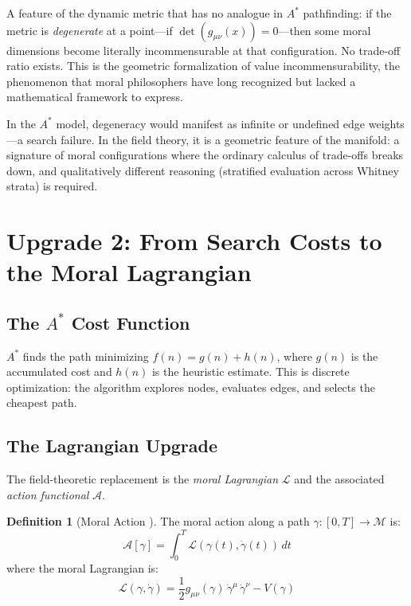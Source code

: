 \documentclass[12pt,letterpaper]{article}
\theoremstyle{definition}
\newtheorem{definition}[theorem]{Definition}
\newcommand{\calM}{\mathcal{M}}
\newcommand{\calA}{\mathcal{A}}
\newcommand{\calL}{\mathcal{L}}
\begin{document}
A feature of the dynamic metric that has no analogue in $A^*$ pathfinding: if the metric is \emph{degenerate} at a point---if $\det(g_{\mu\nu}(x)) = 0$---then some moral dimensions become literally incommensurable at that configuration. No trade-off ratio exists. This is the geometric formalization of value incommensurability, the phenomenon that moral philosophers have long recognized but lacked a mathematical framework to express.

In the $A^*$ model, degeneracy would manifest as infinite or undefined edge weights---a search failure. In the field theory, it is a geometric feature of the manifold: a signature of moral configurations where the ordinary calculus of trade-offs breaks down, and qualitatively different reasoning (stratified evaluation across Whitney strata) is required.


\section{Upgrade 2: From Search Costs to the Moral Lagrangian}
\label{sec:lagrangian}

\subsection{The $A^*$ Cost Function}

$A^*$ finds the path minimizing $f(n) = g(n) + h(n)$, where $g(n)$ is the accumulated cost and $h(n)$ is the heuristic estimate. This is discrete optimization: the algorithm explores nodes, evaluates edges, and selects the cheapest path.

\subsection{The Lagrangian Upgrade}

The field-theoretic replacement is the \emph{moral Lagrangian} $\calL$ and the associated \emph{action functional} $\calA$.

\begin{definition}[Moral Action {\cite[\S11.4]{bond2026ge}}]
The moral action along a path $\gamma: [0,T] \to \calM$ is:
\begin{equation}
\calA[\gamma] = \int_0^T \calL(\gamma(t), \dot{\gamma}(t))\, dt
\end{equation}
where the moral Lagrangian is:
\begin{equation}\label{eq:lagrangian}
\calL(\gamma, \dot{\gamma}) = \frac{1}{2} g_{\mu\nu}(\gamma)\, \dot{\gamma}^\mu\, \dot{\gamma}^\nu - V(\gamma)
\end{equation}
\end{definition}
\end{document}

